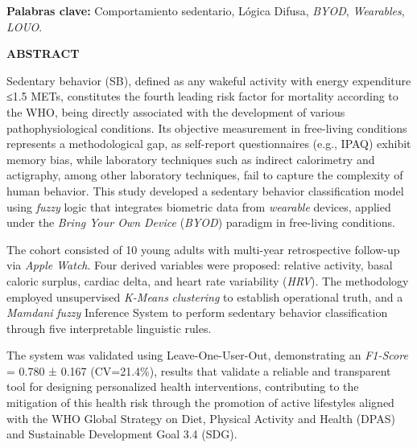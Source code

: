 \documentclass[12pt,letterpaper,oneside]{report}
\begin{document}
\vspace{0.5cm}
\noindent\textbf{Palabras clave:} Comportamiento sedentario, Lógica Difusa, \textit{BYOD}, \textit{Wearables}, \textit{LOUO}.

\newpage
\thispagestyle{empty}

{\centering
{\fontsize{14}{16}\selectfont\bfseries ABSTRACT}\\[1cm]
}

\setlength{\parindent}{1.27cm}
\onehalfspacing
\setlength{\parskip}{6pt plus 2pt minus 1pt}

\noindent Sedentary behavior (SB), defined as any wakeful activity with energy expenditure ≤1.5 METs, constitutes the fourth leading risk factor for mortality according to the WHO, being directly associated with the development of various pathophysiological conditions. Its objective measurement in free-living conditions represents a methodological gap, as self-report questionnaires (e.g., IPAQ) exhibit memory bias, while laboratory techniques such as indirect calorimetry and actigraphy, among other laboratory techniques, fail to capture the complexity of human behavior. This study developed a sedentary behavior classification model using \textit{fuzzy} logic that integrates biometric data from \textit{wearable} devices, applied under the \textit{Bring Your Own Device} (\textit{BYOD}) paradigm in free-living conditions.

The cohort consisted of 10 young adults with multi-year retrospective follow-up via \textit{Apple Watch}. Four derived variables were proposed: relative activity, basal caloric surplus, cardiac delta, and heart rate variability (\textit{HRV}). The methodology employed unsupervised \textit{K-Means} \textit{clustering} to establish operational truth, and a \textit{Mamdani} \textit{fuzzy} Inference System to perform sedentary behavior classification through five interpretable linguistic rules.

The system was validated using Leave-One-User-Out, demonstrating an \textit{F1-Score} = 0.780 ± 0.167 (CV=21.4\%), results that validate a reliable and transparent tool for designing personalized health interventions, contributing to the mitigation of this health risk through the promotion of active lifestyles aligned with the WHO Global Strategy on Diet, Physical Activity and Health (DPAS) and Sustainable Development Goal 3.4 (SDG).
\end{document}
